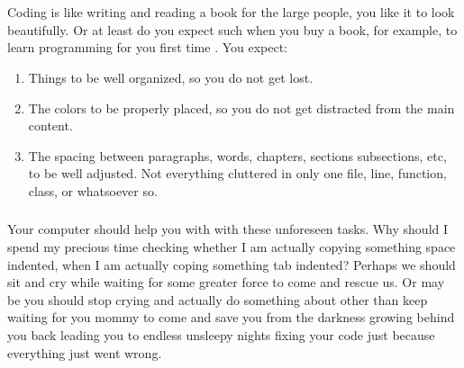 

\chapter{}


\section{}

    Coding is like writing and reading a book for the large people, you like it
    to look beautifully. Or at least do you expect such when you buy a book, for
    example, to learn programming for you first time \cite{howNovicesRead}.
    You expect:

\begin{enumerate}
    \item
        Things to be well organized,
        so you do not get lost.
    \item
        The colors to be properly placed,
        so you do not get distracted from the main content.
    \item
        The spacing between paragraphs, words, chapters, sections
        subsections, etc, to be well adjusted.
        Not everything cluttered in only one file,
        line, function, class, or whatsoever so.
\end{enumerate}


\subsection{}

    Your computer should help you with with these unforeseen tasks.
    Why should I spend my precious time checking whether I am actually copying
    something space indented,
    when I am actually coping something tab indented?
    Perhaps we should sit and cry while waiting for some greater force to come
    and rescue us. Or may be you should stop crying and actually do something
    about other than keep waiting for you mommy to come and save you from the
    darkness growing behind you back leading you to endless unsleepy nights
    fixing your code just because everything just went wrong.


